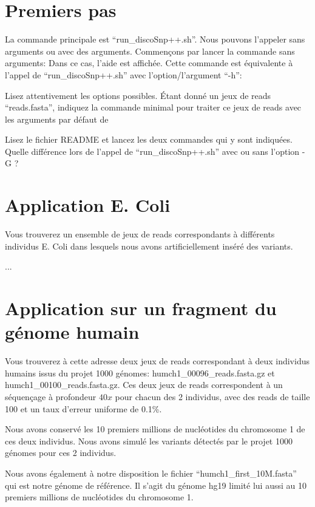 
\section{Premiers pas}
La commande principale est ``run\_discoSnp++.sh''. Nous pouvons l'appeler sans arguments ou avec des arguments. Commençons par lancer la commande sans arguments:
Dans ce cas, l'aide est affichée. Cette commande est équivalente à l'appel de ``run\_discoSnp++.sh'' avec l'option/l'argument ``-h'':

\qu Lisez attentivement les options possibles. Étant donné un jeux de reads ``reads.fasta'', indiquez la commande minimal pour traiter ce jeux de reads avec les arguments par défaut de \discopp


\qu Lisez le fichier README et lancez les deux commandes qui y sont indiquées. Quelle différence lors de l'appel de ``run\_discoSnp++.sh'' avec ou sans l'option -G ?


\section{Application E. Coli}

Vous trouverez un ensemble de jeux de reads correspondants à différents individus E. Coli dans lesquels nous avons artificiellement inséré des variants.   

...


\section{Application sur un fragment du génome humain}
Vous trouverez à cette adresse deux jeux de reads correspondant à deux individus humains issus du projet 1000 génomes: humch1\_00096\_reads.fasta.gz et humch1\_00100\_reads.fasta.gz. Ces deux jeux de reads correspondent à un séquençage à profondeur $40x$ pour chacun des 2 individus, avec des reads de taille 100 et un taux d'erreur uniforme de 0.1\%.

 Nous avons conservé les 10  premiers millions de nucléotides du chromosome 1 de ces deux individus. Nous avons simulé les variants détectés par le projet 1000 génomes pour ces 2 individus.

Nous avons également à notre disposition le fichier ``humch1\_first\_10M.fasta'' qui est notre génome de référence. Il s'agit du génome hg19 limité lui aussi au 10  premiers millions de nucléotides du chromosome 1.
